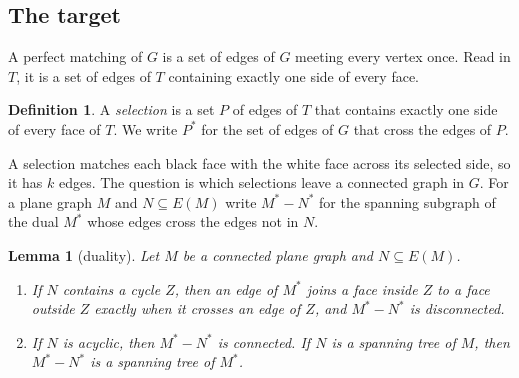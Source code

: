 \documentclass[10pt]{amsart}
\numberwithin{equation}{section}
\newtheorem{lemma}[equation]{Lemma}
\theoremstyle{definition}
\newtheorem{definition}[equation]{Definition}
\theoremstyle{remark}
\newcommand{\T}{T}
\begin{document}
\subsection*{The target}
A perfect matching of $G$ is a set of edges of $G$ meeting every vertex once.
Read in $\T$, it is a set of edges of $\T$ containing exactly one side of every face.

\begin{definition}
A \emph{selection} is a set $P$ of edges of $\T$ that contains exactly one side of every face of $\T$.
We write $P^*$ for the set of edges of $G$ that cross the edges of $P$.
\end{definition}

A selection matches each black face with the white face across its selected side, so it has $k$ edges.
The question is which selections leave a connected graph in $G$.
For a plane graph $M$ and $N\subseteq E(M)$ write $M^*-N^*$ for the spanning subgraph of the dual $M^*$ whose edges cross the edges not in $N$.

\begin{lemma}[duality]\label{lem:duality}
Let $M$ be a connected plane graph and $N\subseteq E(M)$.
\begin{enumerate}
\item If $N$ contains a cycle $Z$, then an edge of $M^*$ joins a face inside $Z$ to a face outside $Z$ exactly when it crosses an edge of $Z$, and $M^*-N^*$ is disconnected.
\item If $N$ is acyclic, then $M^*-N^*$ is connected. If $N$ is a spanning tree of $M$, then $M^*-N^*$ is a spanning tree of $M^*$.
\end{enumerate}
\end{lemma}
\end{document}

